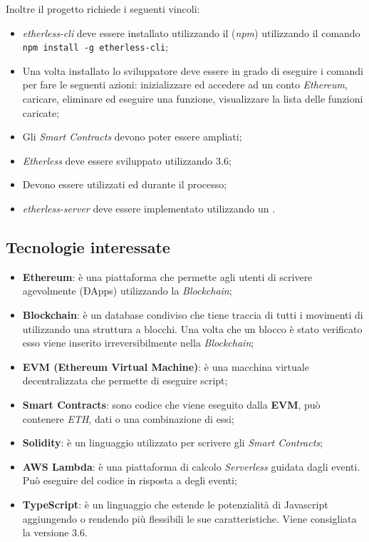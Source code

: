 \documentclass[../studio-di-fattibilita.tex]{subfiles}
\begin{document}
Inoltre il progetto richiede i seguenti vincoli:
\begin{itemize}
      \item \textit{etherless-cli} deve essere installato utilizzando il  (\textit{npm}) utilizzando
            il comando \texttt{npm install -g etherless-cli};
      \item Una volta installato lo sviluppatore deve essere in grado di eseguire i comandi per fare le seguenti azioni: inizializzare ed accedere ad un conto \textit{Ethereum}, caricare, eliminare ed eseguire una funzione,
            visualizzare la lista delle funzioni caricate;
      \item Gli \textit{Smart Contracts} devono poter essere ampliati;
      \item \textit{Etherless} deve essere sviluppato utilizzando  3.6;
      \item Devono essere utilizzati  ed  durante il processo;
      \item \textit{etherless-server} deve essere implementato utilizzando un .
\end{itemize}


\subsection{Tecnologie interessate}%
\label{sub:tecnologie_interessate}
\begin{itemize}
  \item \textbf{Ethereum}: è una piattaforma che permette agli utenti di scrivere agevolmente  (ĐApps) utilizzando la \textit{Blockchain};
  \item \textbf{Blockchain}: è un database condiviso che tiene traccia di tutti i movimenti di  utilizzando una struttura a blocchi. Una volta che un blocco è stato verificato esso viene inserito irreversibilmente nella \textit{Blockchain};
  \item \textbf{EVM (Ethereum Virtual Machine)}: è una macchina virtuale decentralizzata che permette di eseguire script;
  \item \textbf{Smart Contracts}: sono codice che viene eseguito dalla \textbf{EVM}, può contenere \textit{ETH}, dati o una combinazione di essi;
  \item \textbf{Solidity}: è un linguaggio utilizzato per scrivere gli \textit{Smart Contracts};
  \item \textbf{AWS Lambda}: è una piattaforma di calcolo \textit{Serverless} guidata dagli eventi. Può eseguire del codice in risposta a degli eventi;
  \item \textbf{TypeScript}: è un linguaggio che estende le potenzialità di Javascript aggiungendo o rendendo più flessibili le sue caratteristiche. Viene consigliata la versione 3.6.
\end{itemize}
\end{document}
